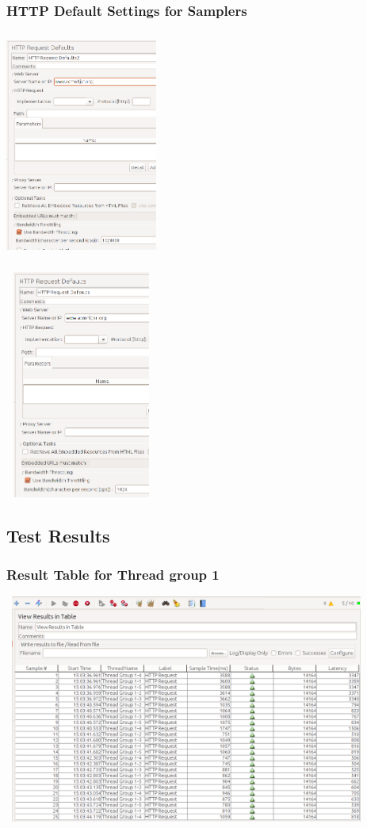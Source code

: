 \documentclass[12pt]{beamer}
\begin{document}
\begin{frame}[c]
 \frametitle{HTTP Default Settings for Samplers}
 \begin{minipage}[t]{0.48\linewidth}
  \centering
   \includegraphics[width=5cm, height=7.5cm]{images/bt3}
 \end{minipage}
 \begin{minipage}[t]{0.48\linewidth}
  \centering
    \includegraphics[width=5cm, height=7.5cm]{images/bt4}
 \end{minipage}

 \end{frame}

 \subsection{Test Results}
 \begin{frame}[c]
  \frametitle{Result Table for Thread group 1}
  \includegraphics[width=12cm, height=7.5cm]{images/bt5}
 \end{frame}
 
\end{document}
